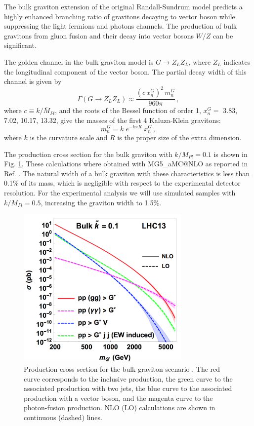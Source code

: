 The bulk graviton extension of the original Randall-Sundrum model predicts a highly enhanced branching ratio of gravitons decaying to vector boson while suppressing the light fermions and photons channels. The production of bulk gravitons from gluon fusion and their decay into vector bosons $W/Z$ can be significant. 

The golden channel in the bulk graviton model is $G\rightarrow Z_L Z_L$, where $Z_L$ indicates the longitudinal component of the vector boson. The partial decay width of this channel is given by
\begin{equation}
\Gamma(G\rightarrow Z_L Z_L) \approx \frac{(c \, x_n^G)^2 \, m^G_n}{960 \pi}\,,
\label{larg:grav}
\end{equation}
where $c\equiv k/\overline{M}_{Pl}$, and the roots of the Bessel function of order 1, $x^G_n = $ 3.83, 7.02, 10.17, 13.32, give the masses of the first 4 Kaluza-Klein gravitons:
\begin{equation}
m^G_n = k \; e^{-k\pi R} \; x^G_n\,,
\end{equation}
where $k$ is the curvature scale and $R$ is the proper size of the extra dimension.

The production cross section for the bulk graviton with $k/M_{Pl} = 0.1$ is shown in Fig. \ref{bulkgrav}. These calculations where obtained with MG5\_aMC@NLO \cite{Alwall:2011uj} as reported in Ref. \cite{Oliveira:2014kla}. The natural width of a bulk graviton with these characteristics is less than 0.1\% of its mass, which is negligible with respect to the experimental detector resolution. For the experimental analysis we will use simulated samples with $k/M_{Pl} = 0.5$, increasing the graviton width to 1.5\%. 

\begin{figure}[htb!!]
\centering
\includegraphics[width=0.75\textwidth]{figures/theory/bulkgrav.png}
\caption[Bulk Graviton cross section]{Production cross section for the bulk graviton scenario \cite{Oliveira:2014kla}. The red curve corresponds to the inclusive production, the green curve to the associated production with two jets, the blue curve to the associated production with a vector boson, and the magenta curve to the photon-fusion production. NLO (LO) calculations are shown in continuous (dashed) lines.} 
\label{bulkgrav}
\end{figure}

